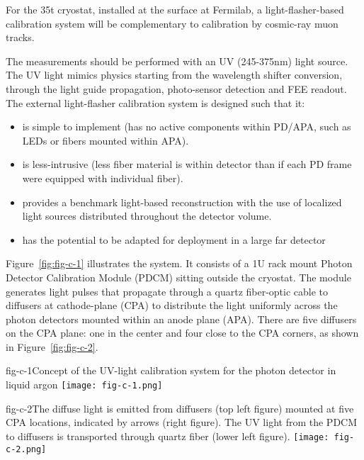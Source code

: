 For the 35t cryostat, installed at the surface at Fermilab,  a light-flasher-based calibration system will be
complementary to calibration by cosmic-ray muon tracks.

The  measurements should be performed with an UV
(245-375nm) light source. The UV light mimics physics starting from
the wavelength shifter conversion, through the light guide propagation,
photo-sensor detection and FEE readout.  The external light-flasher
calibration system is designed such that it:
\begin{itemize}
\item is simple to implement (has no active components within PD/APA, such as
  LEDs or fibers mounted within APA).
\item is less-intrusive (less fiber material is within detector %
than if each PD frame were equipped with individual fiber).
  \item
  provides a benchmark light-based reconstruction with the use of
  localized light sources distributed throughout the detector volume.
\item has the potential to be adapted for deployment in a large far
  detector%
\end{itemize}

Figure~\ref{fig:fig-c-1} illustrates the system. It
consists of a 1U rack mount Photon Detector Calibration Module (PDCM)
sitting outside the cryostat. The module generates light
pulses that propagate through a quartz fiber-optic cable to diffusers
at cathode-plane (CPA) to distribute the light uniformly across the
photon detectors mounted within an anode plane (APA).  There are five
diffusers on the CPA plane: one in the center and four close
to the CPA corners, as shown in Figure~\ref{fig:fig-c-2}. 

%
\begin{cdrfigure}{fig-c-1}{Concept of the UV-light calibration system for the photon
  detector in liquid argon} 
  \texttt{[image: fig-c-1.png]}
\end{cdrfigure}


\begin{cdrfigure}{fig-c-2}{The diffuse light is emitted from diffusers (top left figure)
  mounted at five CPA locations, indicated by arrows (right figure).
  The UV light from the PDCM to diffusers is transported through
  quartz fiber (lower left figure).}
\texttt{[image: fig-c-2.png]}
\end{cdrfigure}


